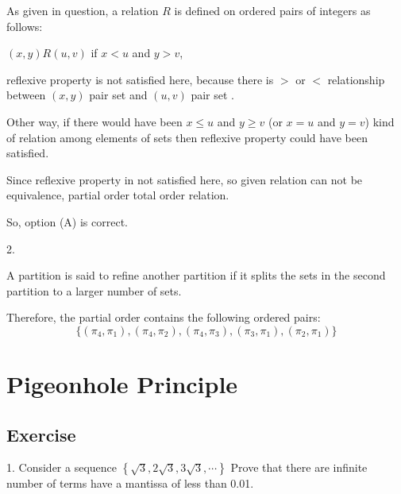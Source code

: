 \documentclass[12pt]{article}
\begin{document}
	As given in question, a relation $R$ is defined on ordered pairs of integers as follows: 
	\begin{center}
		$(x,y) R(u,v)$ if $x < u$ and $y > v$,
	\end{center}  reflexive property is not satisfied here, because there is $>$ or $<$ relationship between $(x ,y)$ pair set and $(u,v)$ pair set . 
	\par Other way, if there would have been $x \leqslant u$ and $y \geqslant v$ (or $x=u$ and $y=v$) kind of relation among elements of sets then reflexive property could have been satisfied. 
	\par Since reflexive property in not satisfied here, so given relation can not be equivalence, partial order total order relation.
	\par So, option (A) is correct.
	\par 
	2. 
		\par A partition is said to refine another partition if it splits the sets in the second partition to a larger number of sets.
		\par Therefore, the partial order contains the following ordered pairs: $$\{(\pi_4,\pi_1),(\pi_4,\pi_2),(\pi_4,\pi_3),(\pi_3,\pi_1),(\pi_2,\pi_1)\}$$
\section{Pigeonhole Principle}
\subsection{Exercise}
	1. Consider a sequence $\left\lbrace \sqrt{3}, 2\sqrt{3}, 3\sqrt{3}, \cdots \right\rbrace$ Prove that there are infinite number of terms have a mantissa of less than 0.01.
\end{document}
